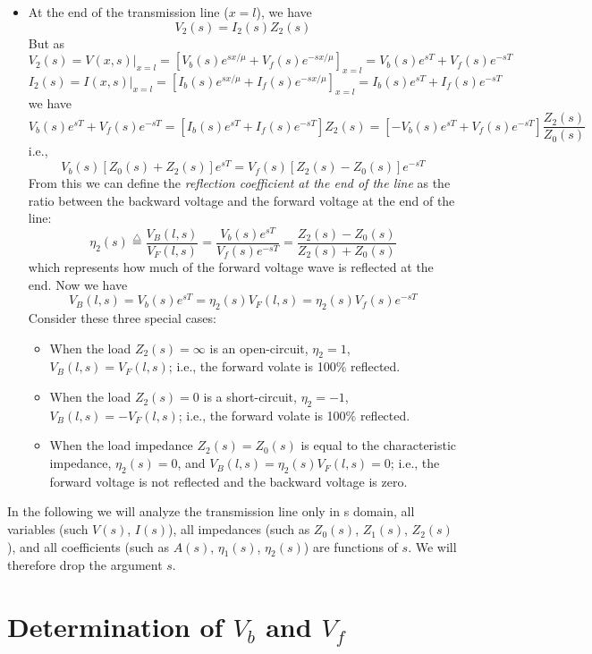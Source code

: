 \begin{itemize}
\item At the end of the transmission line ($x=l$), we have
  \[	V_2(s)=I_2(s)Z_2(s)	\]
  But as
  \[ V_2(s)=V(x,s)|_{x=l}=[V_b(s)e^{sx/\mu}+V_f(s)e^{-sx/\mu}]_{x=l}
  =V_b(s)e^{sT}+V_f(s)e^{-sT}	\]
  \[ I_2(s)=I(x,s)|_{x=l}=[I_b(s)e^{sx/\mu}+I_f(s)e^{-sx/\mu}]_{x=l}
  =I_b(s)e^{sT}+I_f(s)e^{-sT}	\]
  we have
  \[ V_b(s)e^{sT}+V_f(s)e^{-sT}=[I_b(s)e^{sT}+I_f(s)e^{-sT}]Z_2(s)
  =[-V_b(s)e^{sT}+V_f(s)e^{-sT}]\frac{Z_2(s)}{Z_0(s)} \]
  i.e.,
  \[ V_b(s)[Z_0(s)+Z_2(s)]e^{sT} =V_f(s)[Z_2(s)-Z_0(s)]e^{-sT} \]
  From this we can define the {\em reflection coefficient at the end of the line}
  as the ratio between the backward voltage and the forward voltage at the end 
  of the line:
  \[	\eta_2(s)\stackrel{\triangle}{=}\frac{V_B(l,s)}{V_F(l,s)}
  =\frac{V_b(s)e^{sT}}{V_f(s)e^{-sT}}=\frac{Z_2(s)-Z_0(s)}{Z_2(s)+Z_0(s)}	\]
  which represents how much of the forward voltage wave is reflected at the 
  end. Now we have
  \[ V_B(l,s)=V_b(s) e^{sT}=\eta_2(s) V_F(l,s)=\eta_2(s) V_f(s) e^{-sT}  \]
  Consider these three special cases:
  \begin{itemize}
  \item When the load $Z_2(s)=\infty$ is an open-circuit, $\eta_2=1$,
    $V_B(l,s)=V_F(l,s)$; i.e., the forward volate is 100\% reflected.
  \item When the load $Z_2(s)=0$ is a short-circuit, $\eta_2=-1$, 
    $V_B(l,s)=-V_F(l,s)$; i.e., the forward volate is 100\% reflected.
  \item When the load impedance $Z_2(s)=Z_0(s)$ is equal to the characteristic
    impedance, $\eta_2(s)=0$, and $V_B(l,s)=\eta_2(s) V_F(l,s)=0$; i.e.,
    the forward voltage is not reflected and the backward voltage is zero.
  \end{itemize}

\end{itemize}
In the following we will analyze the transmission line only in s domain, all
variables (such $V(s)$, $I(s)$), all impedances (such as $Z_0(s)$, $Z_1(s)$, 
$Z_2(s)$), and all coefficients (such as $A(s)$, $\eta_1(s)$, $\eta_2(s)$) are 
functions of $s$. We will therefore drop the argument $s$.


\newpage
\section*{Determination of $V_b$ and $V_f$}

